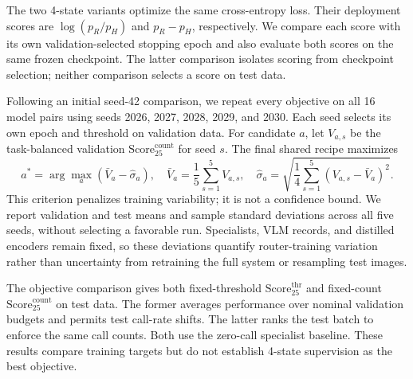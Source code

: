 The two 4-state variants optimize the same cross-entropy loss. Their deployment scores are $\log(p_R/p_H)$ and $p_R-p_H$, respectively. We compare each score with its own validation-selected stopping epoch and also evaluate both scores on the same frozen checkpoint. The latter comparison isolates scoring from checkpoint selection; neither comparison selects a score on test data.

Following an initial seed-42 comparison, we repeat every objective on all 16 model pairs using seeds 2026, 2027, 2028, 2029, and 2030. Each seed selects its own epoch and threshold on validation data. For candidate $a$, let $V_{a,s}$ be the task-balanced validation $\mathrm{Score}_{25}^{\mathrm{count}}$ for seed $s$. The final shared recipe maximizes
\begin{equation}
 a^*=\arg\max_a\left(\bar V_a-\widehat\sigma_a\right),\quad
 \bar V_a=\frac{1}{5}\sum_{s=1}^{5}V_{a,s},\quad
 \widehat\sigma_a=\sqrt{\frac{1}{4}\sum_{s=1}^{5}(V_{a,s}-\bar V_a)^2}.
\end{equation}
This criterion penalizes training variability; it is not a confidence bound. We report validation and test means and sample standard deviations across all five seeds, without selecting a favorable run. Specialists, VLM records, and distilled encoders remain fixed, so these deviations quantify router-training variation rather than uncertainty from retraining the full system or resampling test images.

The objective comparison gives both fixed-threshold $\mathrm{Score}_{25}^{\mathrm{thr}}$ and fixed-count $\mathrm{Score}_{25}^{\mathrm{count}}$ on test data. The former averages performance over nominal validation budgets and permits test call-rate shifts. The latter ranks the test batch to enforce the same call counts. Both use the zero-call specialist baseline. These results compare training targets but do not establish 4-state supervision as the best objective.

